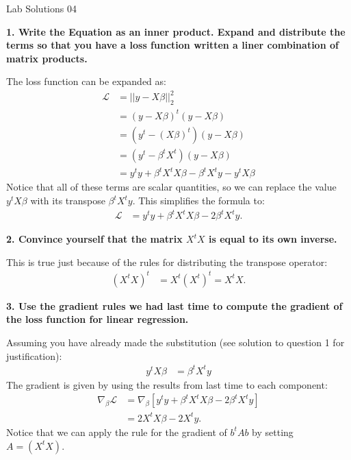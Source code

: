 \documentclass[12pt,hidelinks]{article}
\numberwithin{equation}{section}
\begin{document}
{\LARGE Lab Solutions 04}

\vspace*{12pt}

\textbf{1. Write the Equation as an inner product. Expand and distribute
the terms so that you have a loss function written a liner combination of
matrix products.}

\vspace*{12pt}

The loss function can be expanded as:
\begin{align}
\mathcal{L} &= || y - X \beta ||_2^2 \\
&= (y - X \beta)^t (y - X \beta) \\
&= (y^t - (X \beta)^t) (y - X \beta) \\
&= (y^t - \beta^t X^t) (y - X \beta) \\
&= y^t y + \beta^t X^t X \beta - \beta^t X^t y - y^t X \beta
\end{align}
Notice that all of these terms are scalar quantities, so we can replace the
value $y^t X \beta$ with its transpose $\beta^t X^t y$. This simplifies the
formula to:
\begin{align}
\mathcal{L} &= y^t y + \beta^t X^t X \beta - 2 \beta^t X^t y.
\end{align}

\vspace*{12pt}

\textbf{2. Convince yourself that the matrix $X^t X$ is equal to its own inverse.}

\vspace*{12pt}

This is true just because of the rules for distributing the transpose operator:
\begin{align}
(X^t X)^t &= X^t (X^t)^t = X^t X.
\end{align}

\vspace*{12pt}

\textbf{3. Use the gradient rules we had last time to compute the gradient of the
loss function for linear regression.}

\vspace*{12pt}

Assuming you have already made the substitution (see solution to question 1
for justification):
\begin{align}
y^t X \beta &= \beta^t X^t y
\end{align}
The gradient is given by using the results from last time to each component:
\begin{align}
\nabla_\beta \mathcal{L} &= \nabla_\beta \left[ y^t y + \beta^t X^t X \beta - 2 \beta^t X^t y \right]\\
&= 2 X^t X \beta - 2 X^t y.
\end{align}
Notice that we can apply the rule for the gradient of $b^t A b$ by setting
$A = (X^tX)$.
\end{document}
